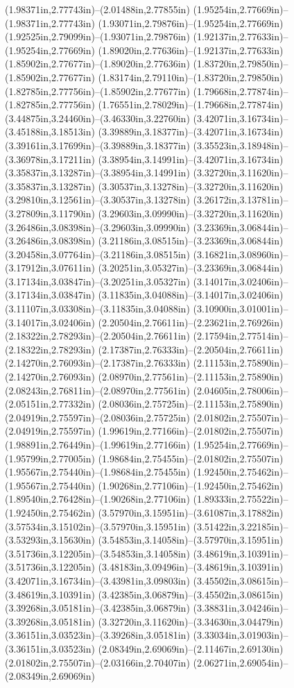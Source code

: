 (1.98371in,2.77743in)--(2.01488in,2.77855in) (1.95254in,2.77669in)--(1.98371in,2.77743in) (1.93071in,2.79876in)--(1.95254in,2.77669in) (1.92525in,2.79099in)--(1.93071in,2.79876in) (1.92137in,2.77633in)--(1.95254in,2.77669in) (1.89020in,2.77636in)--(1.92137in,2.77633in) (1.85902in,2.77677in)--(1.89020in,2.77636in) (1.83720in,2.79850in)--(1.85902in,2.77677in) (1.83174in,2.79110in)--(1.83720in,2.79850in) (1.82785in,2.77756in)--(1.85902in,2.77677in) (1.79668in,2.77874in)--(1.82785in,2.77756in) (1.76551in,2.78029in)--(1.79668in,2.77874in) (3.44875in,3.24460in)--(3.46330in,3.22760in) (3.42071in,3.16734in)--(3.45188in,3.18513in) (3.39889in,3.18377in)--(3.42071in,3.16734in) (3.39161in,3.17699in)--(3.39889in,3.18377in) (3.35523in,3.18948in)--(3.36978in,3.17211in) (3.38954in,3.14991in)--(3.42071in,3.16734in) (3.35837in,3.13287in)--(3.38954in,3.14991in) (3.32720in,3.11620in)--(3.35837in,3.13287in) (3.30537in,3.13278in)--(3.32720in,3.11620in) (3.29810in,3.12561in)--(3.30537in,3.13278in) (3.26172in,3.13781in)--(3.27809in,3.11790in) (3.29603in,3.09990in)--(3.32720in,3.11620in) (3.26486in,3.08398in)--(3.29603in,3.09990in) (3.23369in,3.06844in)--(3.26486in,3.08398in) (3.21186in,3.08515in)--(3.23369in,3.06844in) (3.20458in,3.07764in)--(3.21186in,3.08515in) (3.16821in,3.08960in)--(3.17912in,3.07611in) (3.20251in,3.05327in)--(3.23369in,3.06844in) (3.17134in,3.03847in)--(3.20251in,3.05327in) (3.14017in,3.02406in)--(3.17134in,3.03847in) (3.11835in,3.04088in)--(3.14017in,3.02406in) (3.11107in,3.03308in)--(3.11835in,3.04088in) (3.10900in,3.01001in)--(3.14017in,3.02406in) (2.20504in,2.76611in)--(2.23621in,2.76926in) (2.18322in,2.78293in)--(2.20504in,2.76611in) (2.17594in,2.77514in)--(2.18322in,2.78293in) (2.17387in,2.76333in)--(2.20504in,2.76611in) (2.14270in,2.76093in)--(2.17387in,2.76333in) (2.11153in,2.75890in)--(2.14270in,2.76093in) (2.08970in,2.77561in)--(2.11153in,2.75890in) (2.08243in,2.76811in)--(2.08970in,2.77561in) (2.04605in,2.78006in)--(2.05151in,2.77332in) (2.08036in,2.75725in)--(2.11153in,2.75890in) (2.04919in,2.75597in)--(2.08036in,2.75725in) (2.01802in,2.75507in)--(2.04919in,2.75597in) (1.99619in,2.77166in)--(2.01802in,2.75507in) (1.98891in,2.76449in)--(1.99619in,2.77166in) (1.95254in,2.77669in)--(1.95799in,2.77005in) (1.98684in,2.75455in)--(2.01802in,2.75507in) (1.95567in,2.75440in)--(1.98684in,2.75455in) (1.92450in,2.75462in)--(1.95567in,2.75440in) (1.90268in,2.77106in)--(1.92450in,2.75462in) (1.89540in,2.76428in)--(1.90268in,2.77106in) (1.89333in,2.75522in)--(1.92450in,2.75462in) (3.57970in,3.15951in)--(3.61087in,3.17882in) (3.57534in,3.15102in)--(3.57970in,3.15951in) (3.51422in,3.22185in)--(3.53293in,3.15630in) (3.54853in,3.14058in)--(3.57970in,3.15951in) (3.51736in,3.12205in)--(3.54853in,3.14058in) (3.48619in,3.10391in)--(3.51736in,3.12205in) (3.48183in,3.09496in)--(3.48619in,3.10391in) (3.42071in,3.16734in)--(3.43981in,3.09803in) (3.45502in,3.08615in)--(3.48619in,3.10391in) (3.42385in,3.06879in)--(3.45502in,3.08615in) (3.39268in,3.05181in)--(3.42385in,3.06879in) (3.38831in,3.04246in)--(3.39268in,3.05181in) (3.32720in,3.11620in)--(3.34630in,3.04479in) (3.36151in,3.03523in)--(3.39268in,3.05181in) (3.33034in,3.01903in)--(3.36151in,3.03523in) (2.08349in,2.69069in)--(2.11467in,2.69130in) (2.01802in,2.75507in)--(2.03166in,2.70407in) (2.06271in,2.69054in)--(2.08349in,2.69069in) 